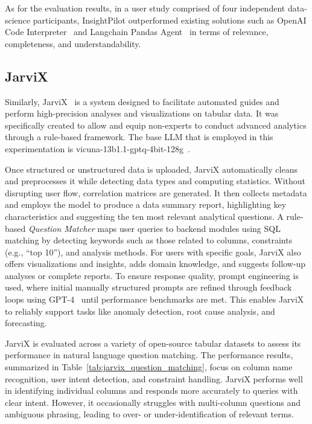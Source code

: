 \documentclass{DESSThesis}
\begin{document}
As for the evaluation results, in a user study comprised of four independent data-science participants, InsightPilot outperformed existing solutions such as OpenAI Code Interpreter~\cite{openai_code_interpreter_tool} and Langchain Pandas Agent~\cite{langchain_pandas} in terms of relevance, completeness, and understandability.

\subsection{JarviX}

Similarly, JarviX~\cite{liu2023jarvixllmcodeplatform} is a system designed to facilitate automated guides and perform high-precision analyses and visualizations on tabular data. It was specifically created to allow and equip non-experts to conduct advanced analytics through a rule-based framework. The base LLM that is employed in this experimentation is vicuna-13b1.1-gptq-4bit-128g~\cite{vicuna-13B-1.1-GPTQ-4bit-128g}.

Once structured or unstructured data is uploaded, JarviX automatically cleans and preprocesses it while detecting data types and computing statistics. Without disrupting user flow, correlation matrices are generated. It then collects metadata and employs the model to produce a data summary report, highlighting key characteristics and suggesting the ten most relevant analytical questions. A rule-based \emph{Question Matcher} maps user queries to backend modules using SQL matching by detecting keywords such as those related to columns, constraints (e.g., “top 10”), and analysis methods. For users with specific goals, JarviX also offers visualizations and insights, adds domain knowledge, and suggests follow-up analyses or complete reports. To ensure response quality, prompt engineering is used, where initial manually structured prompts are refined through feedback loops using GPT-4~\cite{openai2024gpt4technicalreport} until performance benchmarks are met. This enables JarviX to reliably support tasks like anomaly detection, root cause analysis, and forecasting.

JarviX is evaluated across a variety of open-source tabular datasets to assess its performance in natural language question matching. The performance results, summarized in Table~\ref{tab:jarvix_question_matching}, focus on column name recognition, user intent detection, and constraint handling. JarviX performs well in identifying individual columns and responds more accurately to queries with clear intent. However, it occasionally struggles with multi-column questions and ambiguous phrasing, leading to over- or under-identification of relevant terms.
\end{document}

